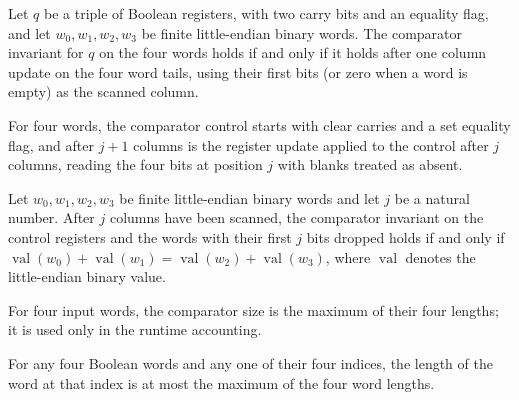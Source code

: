 \begin{lemma}
\label{Complexity.clCmpUpdate_spec}
\leanok
{}
Let $q$ be a triple of Boolean registers, with two carry bits and an equality flag, and
let $w_0,w_1,w_2,w_3$ be finite little-endian binary words. The comparator invariant for
$q$ on the four words holds if and only if it holds after one column update on the four
word tails, using their first bits (or zero when a word is empty) as the scanned column.
\end{lemma}

\begin{definition}
\label{Complexity.clCmpOrbit}
\leanok
{}
For four words, the comparator control starts with clear carries and a set equality flag, and after $j+1$ columns is the register update applied to the control after $j$ columns, reading the four bits at position $j$ with blanks treated as absent.
\end{definition}

\begin{lemma}
\label{Complexity.clCmpOrbit_spec}
\leanok
{}
Let $w_0,w_1,w_2,w_3$ be finite little-endian binary words and let $j$ be a natural
number. After $j$ columns have been scanned, the comparator invariant on the control
registers and the words with their first $j$ bits dropped holds if and only if
$\operatorname{val}(w_0)+\operatorname{val}(w_1)=\operatorname{val}(w_2)+\operatorname{val}(w_3)$,
where $\operatorname{val}$ denotes the little-endian binary value.
\end{lemma}

\begin{definition}
\label{Complexity.clCmpSize}
\leanok
For four input words, the comparator size is the maximum of their four lengths; it is used only in the runtime accounting.
\end{definition}

\begin{lemma}
\label{Complexity.clCmp_width}
\leanok
{}
For any four Boolean words and any one of their four indices, the length of the word at
that index is at most the maximum of the four word lengths.
\end{lemma}

